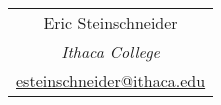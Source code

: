 \begin{tabular}{c}
Eric Steinschneider\\[1ex]
{\small\emph{Ithaca College}}\\[0.5ex]
{\small\href{mailto:esteinschneider@ithaca.edu}{esteinschneider@ithaca.edu}}
\end{tabular}